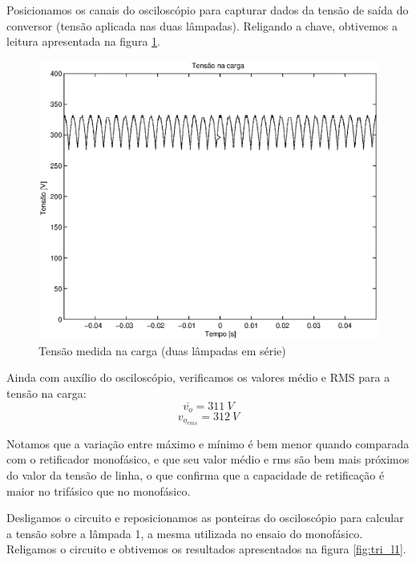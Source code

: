 \documentclass{report}
\begin{document}
Posicionamos os canais do osciloscópio para capturar dados da tensão de saída do conversor (tensão aplicada nas duas lâmpadas). Religando a chave, obtivemos a leitura apresentada na figura \ref{fig:tri_r}. 

\begin{figure}[H]
	\centering
	\includegraphics[width=\linewidth]{dados/trifasico/tri_r}
	\caption{Tensão medida na carga (duas lâmpadas em série)}
	\label{fig:tri_r}
\end{figure}

Ainda com auxílio do osciloscópio, verificamos os valores médio e RMS para a tensão na carga:
\begin{equation}
\overline{v_o} = 311\ V
\end{equation}
\begin{equation}
v_{o_{rms}} = 312\ V
\end{equation}

Notamos que a variação entre máximo e mínimo é bem menor quando comparada com o retificador monofásico, e que seu valor médio e rms são bem mais próximos do valor da tensão de linha, o que confirma que a capacidade de retificação é maior no trifásico que no monofásico.

Desligamos o circuito e reposicionamos as ponteiras do osciloscópio para calcular a tensão sobre a lâmpada 1, a mesma utilizada no ensaio do monofásico. Religamos o circuito e obtivemos os resultados apresentados na figura \ref{fig:tri_l1}.
\end{document}
